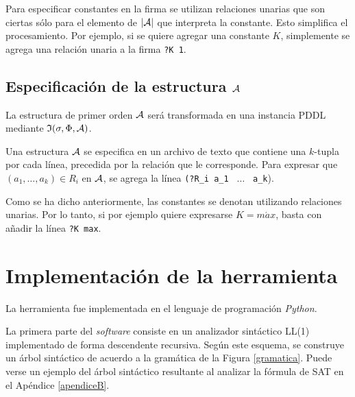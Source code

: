 Para especificar constantes en la firma se utilizan relaciones unarias que son
ciertas sólo para el elemento de $|\mathcal{A}|$ que interpreta la constante.
Esto simplifica el procesamiento. Por ejemplo, si se quiere agregar una
constante $K$, simplemente se agrega una relación unaria a la
firma \texttt{?K 1}.

\subsection{Especificación de la estructura $\mathcal{A}$}
La estructura de primer orden $\mathcal{A}$ será transformada en una instancia PDDL
mediante $\mathfrak{I}(\sigma,\Phi,\mathcal{A})$.

Una estructura $\mathcal{A}$ se especifica en un archivo de texto que contiene una
$k$-tupla por cada línea, precedida por la relación que le corresponde.
Para expresar que $(a_1,\ldots,a_k) \in R_i$ en $\mathcal{A}$, se agrega la línea
\texttt{(?R\_i a\_1 } $\ldots$ \texttt{ a\_k}).

Como se ha dicho anteriormente, las constantes se denotan utilizando relaciones
unarias. Por lo tanto, si por ejemplo quiere expresarse $K = m\acute{a}x$,
basta con añadir la línea \texttt{?K max}.



\section{Implementación de la herramienta}
La herramienta fue implementada en el lenguaje de programación \textit{Python}.

La primera parte del \textit{software} consiste en un analizador sintáctico LL(1) implementado
de forma descendente recursiva. Según este esquema, se construye un árbol
sintáctico de acuerdo a la gramática de la Figura \ref{gramatica}. Puede verse
un ejemplo del árbol sintáctico resultante al analizar la fórmula de SAT en el
Apéndice \ref{apendiceB}.


